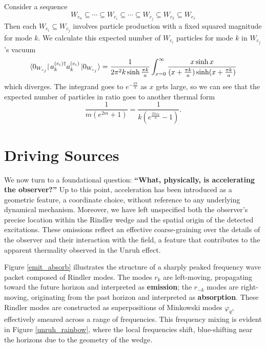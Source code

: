 \documentclass[12pt,a4paper]{article}
\begin{document}
Consider a sequence
\begin{equation}
  W_{c_n} \subseteq \cdots \subseteq W_{c_i} \subseteq \cdots \subseteq W_{c_j} \subseteq W_{c_2} \subseteq W_{c_1}
\end{equation}
Then each $W_{c_i} \subseteq W_{c_j}$ involves particle production with a fixed squared magnitude for mode $k$.  We calculate this expected number of $W_{c_i}$ particles for mode $k$ in $W_{c_j}$'s vacuum
\begin{equation}
  \bra{0_{W_{c_j}}} a^{(c_i)\dagger}_k a^{(c_i)}_k \ket{0_{W_{c_j}}} = \frac{1}{2 \pi^2 k \sinh \frac{\pi k}{a}} \int_{x=0}^\infty \frac{x \sinh x}{(x+\frac{\pi k}{a}) \sinh(x+\frac{\pi k}{a})}
\end{equation}
which diverges.  The integrand goes to $e^{-\frac{\pi k}{a}}$ as $x$ gets large, so we can see that the expected number of particles in ratio goes to another thermal form
\begin{equation}
  \frac{1}{m (e^{2m} + 1)} = \frac{1}{k (e^{\frac{2\pi \omega_k}{a}} - 1)}.
\end{equation}

\section{Driving Sources}

We now turn to a foundational question: {\bf ``What, physically, is accelerating the observer?''} Up to this point, acceleration has been introduced as a geometric feature, a coordinate choice, without reference to any underlying dynamical mechanism. Moreover, we have left unspecified both the observer’s precise location within the Rindler wedge and the spatial origin of the detected excitations. These omissions reflect an effective coarse-graining over the details of the observer and their interaction with the field, a feature that contributes to the apparent thermality observed in the Unruh effect.

Figure \ref{emit_absorb} illustrates the structure of a sharply peaked frequency wave packet composed of Rindler modes. The modes $r_k$ are left-moving, propagating toward the future horizon and interpreted as {\bf emission}; the $r_{-k}$ modes are right-moving, originating from the past horizon and interpreted as {\bf absorption}. These Rindler modes are constructed as superpositions of Minkowski modes $\varphi_q$, effectively smeared across a range of frequencies. This frequency mixing is evident in Figure \ref{unruh_rainbow}, where the local frequencies shift, blue-shifting near the horizons due to the geometry of the wedge.
\end{document}
